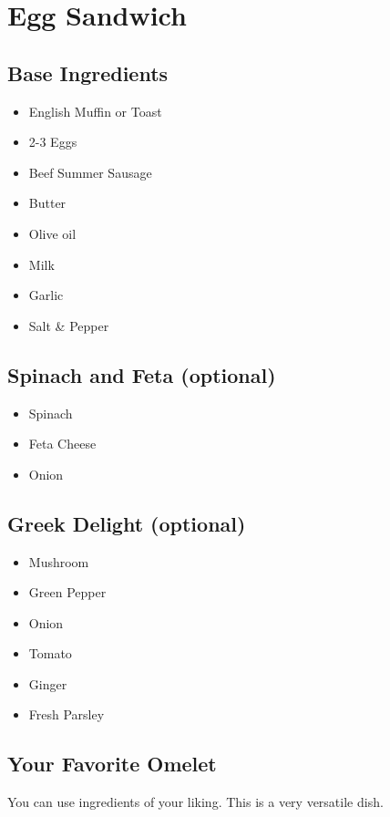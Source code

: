 \thispagestyle{fancy}
\section{Egg Sandwich}
\AddToShipoutPicture*{\EggSandwich}

\subsection*{Base Ingredients}
\begin{multicols}{3}
	\begin{itemize}
		\item English Muffin or Toast
		\item 2-3 Eggs
		\item Beef Summer Sausage
		\item Butter
		\item Olive oil
		\item Milk
		\item Garlic
		\item Salt \& Pepper
	\end{itemize}
\end{multicols}
\subsection*{Spinach and Feta (optional)}
\begin{multicols}{3}
	\begin{itemize}
		\item Spinach
		\item Feta Cheese
		\item Onion
	\end{itemize}
\end{multicols}
\subsection*{Greek Delight (optional)}
\begin{multicols}{3}
	\begin{itemize}
		\item Mushroom
		\item Green Pepper
		\item Onion
		\item Tomato
		\item Ginger
		\item Fresh Parsley
	\end{itemize}
\end{multicols}

\subsection*{Your Favorite Omelet}
You can use ingredients of your liking. This is a very versatile dish.

